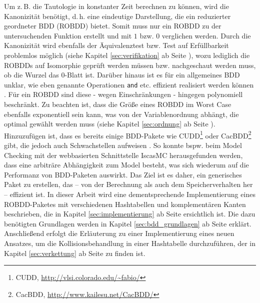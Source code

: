 Um z.\,B. die Tautologie in konstanter Zeit berechnen zu können, wird die Kanonizität benötigt, d.\,h. eine eindeutige Darstellung, die ein reduzierter geordneter BDD (ROBDD) bietet. Somit muss nur ein ROBDD zu der untersuchenden Funktion erstellt und mit $1$ bzw. $0$ verglichen werden. Durch die Kanonizität wird ebenfalls der Äquivalenztest bzw. Test auf Erfüllbarkeit problemlos möglich (siehe Kapitel \ref{sec:verifikation} ab Seite \pageref{sec:verifikation}), wozu lediglich die ROBDDs auf Isomorphie geprüft werden müssen bzw. nachgeschaut werden muss, ob die Wurzel das 0-Blatt ist. Darüber hinaus ist es für ein allgemeines BDD unklar, wie eben genannte Operationen \texttt{and} etc. effizient realisiert werden können \cite{g2002}. Für ein ROBDD sind diese - wegen Einschränkungen - hingegen polynomiell beschränkt. Zu beachten ist, dass die Größe eines ROBDD im Worst Case ebenfalls exponentiell sein kann, was von der Variablenordnung abhängt, die optimal gewählt werden muss (siehe Kapitel \ref{sec:ordnung} ab Seite \pageref{sec:ordnung}).\\
Hinzuzufügen ist, dass es bereits einige BDD-Pakete wie CUDD\footnote{CUDD, \url{http://vlsi.colorado.edu/~fabio/}} oder CacBDD\footnote{CacBDD, \url{http://www.kailesu.net/CacBDD/}} gibt, die jedoch auch Schwachstellen aufweisen \cite{rk2017}. So konnte bspw. beim Model Checking mit der webbasierten Schnittstelle \glqq IscasMC\grqq{} herausgefunden werden, dass eine arbiträre Abhängigkeit zum Model besteht, was sich wiederum auf die Performanz von BDD-Paketen auswirkt. Das Ziel ist es daher, ein generisches Paket zu erstellen, das -- von der Berechnung als auch dem Speicherverhalten her -- effizient ist. In dieser Arbeit wird eine dementsprechende Implementierung eines ROBDD-Paketes mit verschiedenen Hashtabellen und komplementären Kanten beschrieben, die in Kapitel \ref{sec:implementierung} ab Seite \pageref{sec:implementierung} ersichtlich ist. Die dazu benötigten Grundlagen werden in Kapitel \ref{sec:bdd_grundlagen} ab Seite \pageref{sec:bdd_grundlagen} erklärt. Anschließend erfolgt die Erläuterung zu einer Implementierung eines neuen Ansatzes, um die Kollisionsbehandlung in einer Hashtabelle durchzuführen, der in Kapitel \ref{sec:verkettung} ab Seite \pageref{sec:verkettung} zu finden ist.